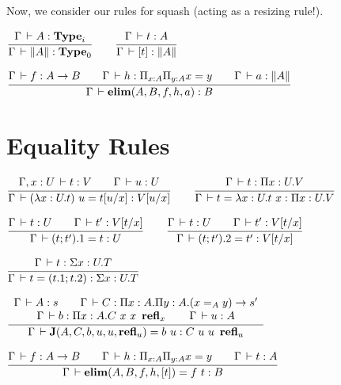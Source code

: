\documentclass[a4paper,english]{lipics-utf8x}
\begin{document}
  \noindent %
  Now, we consider our rules for squash (acting as a resizing rule!).

  \begin{center}
  \(
    \ru{\Gamma \der A : \Type_i
      }{\Gamma \der \squash{A} : \Type_0}
    \qquad
    \ru{\Gamma \der t : A
      }{\Gamma \der [t] : \squash{A}}
  \)
  \end{center}

  \begin{center}
  \(
    \ru{\Gamma \der f : A \to B \qquad
        \Gamma \der h : \Pi_{x:A} \Pi_{y:A} x = y \qquad
        \Gamma \der a : \squash{A}
      }{\Gamma \der \elim(A,B,f,h,a) : B}
  \)
  \end{center}

  \section{Equality Rules}


  \begin{center}
  \(
    \ru{\Gamma, x:U \der t:V \qquad
        \Gamma \der u : U
      }{\Gamma \der (\lambda x:U.t)~u = t[u/x] : V[u/x]}
    \qquad
    \ru{\Gamma \der t : \Pi x:U.V
      }{\Gamma \der t = \lambda x:U.t~x : \Pi x:U.V}
  \)
  \end{center}

  \begin{center}
  \(
    \ru{\Gamma \der t : U \qquad
        \Gamma \der t' : V[t/x]
      }{\Gamma \der (t;t').1 = t : U}
    \qquad
    \ru{\Gamma \der t : U \qquad
        \Gamma \der t' : V[t/x]
      }{\Gamma \der (t;t').2 = t' : V[t/x]}
  \)
  \end{center}

  \begin{center}
  \(
    \ru{\Gamma \der t : \Sigma x:U.T
      }{\Gamma \der t = (t.1 ; t.2) : \Sigma x:U.T}
  \)
  \end{center}

  \begin{center}
  \(
    \dru{\Gamma \der A : s \qquad
         \Gamma \der C : \Pi x:A. \Pi y:A. (x =_A y) \to s'
       }{\Gamma \der b : \Pi x:A. C\ x\ x\ \refl_x \qquad
         \Gamma \der u : A
       }{\Gamma \der \J (A,C,b,u,u,\refl_u) = b\ u : C\ u\ u\ \refl_u}
  \)
  \end{center}

  \begin{center}
  \(
    \ru{\Gamma \der f : A \to B \qquad
        \Gamma \der h : \Pi_{x:A} \Pi_{y:A} x = y \qquad
        \Gamma \der t : A
      }{\Gamma \der \elim(A,B,f,h,[t]) = f\ t : B}
  \)
  \end{center}
\end{document}
